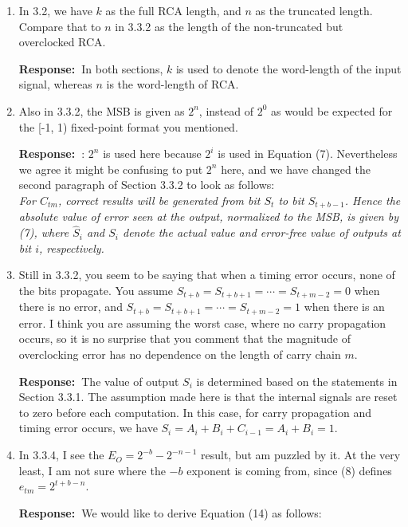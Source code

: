\documentclass[a4paper, 11pt]{article}
\def\Response{\noindent \textbf{Response:~}}
\newcommand{\Question}[1]{\textcolor[rgb]{0.51,0.00,0.00}{#1}}
\newcommand{\PaperText}[1]{\emph{#1}}
\begin{document}
\begin{enumerate}
  \item \Question{In 3.2, we have $k$ as the full RCA length, and $n$ as the truncated length.  Compare that to $n$ in 3.3.2 as the length of the non-truncated but overclocked RCA.}
      
      \Response In both sections, $k$ is used to denote the word-length of the input signal, whereas $n$ is the word-length of RCA.
      
  \item \Question{Also in 3.3.2, the MSB is given as $2^n$, instead of $2^0$ as would be expected for the [-1, 1) fixed-point format you mentioned.}
      
      \Response : $2^n$ is used here because $2^i$ is used in Equation (7). Nevertheless we agree it might be confusing to put $2^n$ here, and we have changed the second paragraph of Section 3.3.2 to look as follows:\\
      
      \PaperText{For $C_{tm}$, correct results will be generated from bit $S_t$ to bit $S_{t+b-1}$. Hence the absolute value of error seen at the output, normalized to the MSB, is given by (7), where $\hat{S}_i$ and $S_i$ denote the actual value and error-free value of outputs at bit $i$, respectively.}\\
      
  \item \Question{Still in 3.3.2, you seem to be saying that when a timing error occurs, none of the bits propagate. You assume $S_{t+b}=S_{t+b+1}=\cdots=S_{t+m-2}=0$ when there is no error, and $S_{t+b}=S_{t+b+1}=\cdots=S_{t+m-2}=1$ when there is an error. I think you are assuming the worst case, where no carry propagation occurs, so it is no surprise that you comment that the magnitude of overclocking error has no dependence on the length of carry chain $m$.}
      
      \Response The value of output $S_i$ is determined based on the statements in Section 3.3.1. The assumption made here is that the internal signals are reset to zero before each computation. In this case, for carry propagation and timing error occurs, we have $S_i=A_i+B_i+C_{i-1}=A_i+B_i=1$.
      
  \item \Question{In 3.3.4, I see the $E_O = 2^{-b}-2^{-n-1}$ result, but am puzzled by it.  At the very least, I am not sure where the $-b$ exponent is coming from, since (8) defines $e_{tm} = 2^{t+b-n}$.}
      
      \Response We would like to derive Equation (14) as follows:
      

\end{enumerate}
\end{document}
